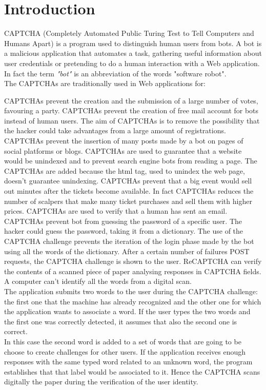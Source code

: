\chapter{Introduction}
CAPTCHA (Completely Automated Public Turing Test to Tell Computers and Humans Apart) is a program used to distinguish human users from bots. A bot is a malicious application that automates a task, gathering useful information about user credentials or pretending to do a human interaction with a Web application. In fact the term \textit{"bot"} is an abbreviation of the words "software robot".\\
The CAPTCHAs are traditionally used in Web applications for\cite{text_audio}:
\begin{itemize}
{CAPTCHAs prevent the creation and the submission of a large number of votes, favouring a party.}
{CAPTCHAs prevent the creation of free mail account for bots instead of human users. The aim of CAPTCHAs is to remove the possibility that the hacker could take advantages from a large amount of registrations.}
{CAPTCHAs prevent the insertion of many posts made by a bot on pages of social platforms or blogs.}
{CAPTCHAs are used to guarantee that a website would be unindexed and to prevent search engine bots from reading a page. The CAPTCHAs are added because the html tag, used to unindex the web page, doesn't guarantee unindexing.}
{CAPTCHAs prevent that a big event would sell out minutes after the tickets become available. In fact CAPTCHAs reduces the number of scalpers that make many ticket purchases and sell them with higher prices.}
{CAPTCHAs are used to verify that a human has sent an email.}
{CAPTCHAs prevent bot from guessing the password of a specific user. The hacker could guess the password, taking it from a dictionary. The use of the CAPTCHA challenge prevents the iteration of the login phase made by the bot using all the words of the dictionary. After a certain number of failures POST requests, the CAPTCHA challenge is shown to the user.}
{ReCAPTCHA can verify the contents of a scanned piece of paper analysing responses in CAPTCHA fields. A computer can't identify all the words from a digital scan.\\
The application submits two words to the user during the CAPTCHA challenge: the first one that the machine has already recognized and the other one for which the application wants to associate a word. If the user types the two words and the first one was correctly detected, it assumes that also the second one is correct.\\
In this case the second word is added to a set of words that are going to be choose to create challenges for other users. If the application receives enough responses with the same typed word related to an unknown word, the program establishes that that label would be associated to it. Hence the CAPTCHA scans digitally the paper during the verification of the user identity.}
\end{itemize}
